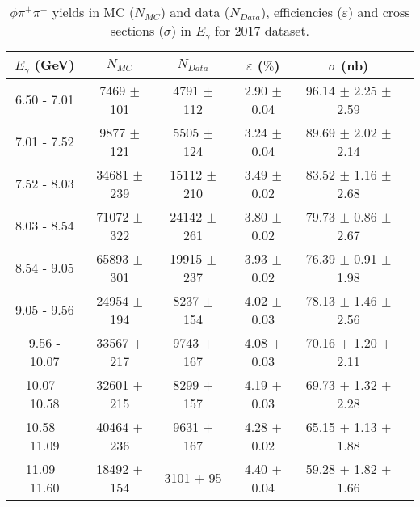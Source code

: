 \begin{center}
\begin{table}[H]
    \caption{$\phi \pi^{+}\pi^{-}$ yields in MC ($N_{MC}$) and data ($N_{Data}$), efficiencies ($\varepsilon$) and cross sections ($\sigma$) in $E_{\gamma}$ for 2017 dataset.}
    \label{tab.y2175.xsec_ul.phi2pi.2.1}
    \begin{tabular}{|c|c|c|c|c|c|}
    \hline
    $E_{\gamma}$ (GeV) & $N_{MC}$ & $N_{Data}$ & $\varepsilon$ ($\%$) & $\sigma$ (nb) \\ 
    \hline
    6.50 - 7.01 & 7469 $\pm$ 101 & 4791 $\pm$ 112 & 2.90 $\pm$ 0.04 & 96.14 $\pm$ 2.25 $\pm$ 2.59 \\ 
    7.01 - 7.52 & 9877 $\pm$ 121 & 5505 $\pm$ 124 & 3.24 $\pm$ 0.04 & 89.69 $\pm$ 2.02 $\pm$ 2.14 \\ 
    7.52 - 8.03 & 34681 $\pm$ 239 & 15112 $\pm$ 210 & 3.49 $\pm$ 0.02 & 83.52 $\pm$ 1.16 $\pm$ 2.68 \\ 
    8.03 - 8.54 & 71072 $\pm$ 322 & 24142 $\pm$ 261 & 3.80 $\pm$ 0.02 & 79.73 $\pm$ 0.86 $\pm$ 2.67 \\ 
    8.54 - 9.05 & 65893 $\pm$ 301 & 19915 $\pm$ 237 & 3.93 $\pm$ 0.02 & 76.39 $\pm$ 0.91 $\pm$ 1.98 \\ 
    9.05 - 9.56 & 24954 $\pm$ 194 & 8237 $\pm$ 154 & 4.02 $\pm$ 0.03 & 78.13 $\pm$ 1.46 $\pm$ 2.56 \\ 
    9.56 - 10.07 & 33567 $\pm$ 217 & 9743 $\pm$ 167 & 4.08 $\pm$ 0.03 & 70.16 $\pm$ 1.20 $\pm$ 2.11 \\ 
    10.07 - 10.58 & 32601 $\pm$ 215 & 8299 $\pm$ 157 & 4.19 $\pm$ 0.03 & 69.73 $\pm$ 1.32 $\pm$ 2.28 \\ 
    10.58 - 11.09 & 40464 $\pm$ 236 & 9631 $\pm$ 167 & 4.28 $\pm$ 0.02 & 65.15 $\pm$ 1.13 $\pm$ 1.88 \\ 
    11.09 - 11.60 & 18492 $\pm$ 154 & 3101 $\pm$ 95 & 4.40 $\pm$ 0.04 & 59.28 $\pm$ 1.82 $\pm$ 1.66 \\ 
   \hline
\end{tabular}
\end{table}
\end{center}

